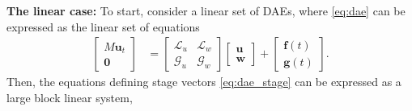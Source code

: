 \documentclass[review]{siamart}
\begin{document}
\textbf{The linear case:} To start, consider a
linear set of DAEs, where \eqref{eq:dae} can be expressed as the linear set of
equations
%
\begin{align}\label{eq:dae_lin}
\begin{bmatrix} M\mathbf{u}_t \\ \mathbf{0} \end{bmatrix}
& = \begin{bmatrix} \mathcal{L}_u & \mathcal{L}_w \\
	\mathcal{G}_u & \mathcal{G}_w\end{bmatrix}
	\begin{bmatrix} \mathbf{u} \\ \mathbf{w} \end{bmatrix} +
		\begin{bmatrix}\mathbf{f}(t) \\ \mathbf{g}(t)\end{bmatrix}.
\end{align}
%
Then, the equations defining stage vectors \eqref{eq:dae_stage} can
be expressed as a large block linear system,
%
\end{document}
